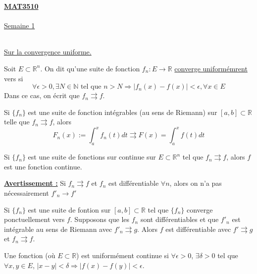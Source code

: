 \documentclass[12pt,a4paper]{article}
\begin{document}
\begin{flushleft}

\underline{\textbf{MAT3510}}
\\~\\
\underline{Semaine 1}
\\~\\

\begin{rap}
\underline{Sur la convergence uniforme.}
\end{rap}

\begin{mydef}
Soit $E \subset \mathbb{R}^n$. On dit qu'une suite de fonction $f_n : E \longrightarrow \mathbb{R}$ \underline{converge uniformémrent} vers \fER si $$ \forall \epsilon > 0 , \exists N \in \mathbb{N} \text{ tel que } n>N \Rightarrow |f_n(x) - f(x)| < \epsilon , \forall x \in E$$  Dans ce cas, on écrit que $f_n \rightrightarrows f$.
\end{mydef}

\begin{thm}
Si $\{f_n \}$ est une suite de fonction intégrables (au sens de Riemann) sur $ [a,b] \subset \mathbb{R}$ telle que $f_n \rightrightarrows f$, alors $$F_n(x) := \int_a^x f_n(t) dt \rightrightarrows F(x) = \int_a^x f(t) dt$$
\end{thm}

\begin{thm}
Si $\{ f_n \}$ est une suite de fonctions sur continue sur $E \subset \mathbb{R}^n$ tel que $f_n \rightrightarrows f$, alors $f$ est une fonction continue.
\end{thm}

\underline{\textbf{Avertissement :}} Si $f_n \rightrightarrows f$ et $f_n$ est différentiable $\forall n$, alors on n'a pas nécessairement $f'_n \rightarrow f'$

\begin{thm}
Si $\{ f_n \}$ est une suite de fontion sur $[a,b] \subset \mathbb{R}$ tel que $\{ f_n \}$ converge ponctuellement vers $f$. Supposons que les $f_n$ sont différentiables et que $f'_n$ est intégrable au sens de Riemann avec $f'_n \rightrightarrows g$. Alors $f$ est différentiable avec $f' \rightrightarrows g$ et $f_n \rightrightarrows f$.
\end{thm}

\begin{mydef}
Une fonction \fER (où $E \subset \mathbb{R}$) est uniformément continue si $\forall \epsilon > 0 $, $\exists \delta >0 $ tel que $\forall x, y \in E$, $|x-y| < \delta \Rightarrow | f(x) - f(y) | < \epsilon $.
\end{mydef}


\end{flushleft}
\end{document}
